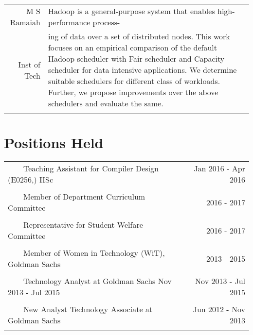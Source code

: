 \documentclass[a4paper,10pt]{article} %
\newcommand{\tabitem}{~~\llap{\textbullet}~~}
\begin{document}
\begin{tabular}{rp{13cm}}
M S Ramaiah & \setlength{\leftskip}{0.4cm} Hadoop is a general-purpose system that enables high-performance process-\\
Inst of Tech & \setlength{\leftskip}{0.4cm}
ing  of data over a set of distributed nodes. This work focuses on an empirical comparison of the default Hadoop scheduler with Fair scheduler and Capacity scheduler for data intensive applications. We determine suitable schedulers for different class of workloads. Further, we propose improvements over the above schedulers and evaluate  the same.\\ 
& \\
\end{tabular}


\section{Positions Held}

\begin{tabular}{p{12cm}r}
\tabitem Teaching Assistant for Compiler Design (E0256,) IISc  & Jan 2016 - Apr 2016 \\
&\\
\tabitem Member of Department Curriculum Committee &  2016 - 2017\\
&\\
\tabitem Representative for Student Welfare Committee  & 2016 - 2017\\
&\\
\tabitem Member of Women in Technology (WiT), Goldman Sachs  & 2013 - 2015\\
&\\
\tabitem Technology Analyst at Goldman Sachs Nov 2013 - Jul 2015 & Nov 2013 - Jul 2015 \\
&\\
\tabitem New Analyst Technology Associate at Goldman Sachs & Jun 2012 - Nov 2013 \\
&\\
\end{tabular}
\end{document}
